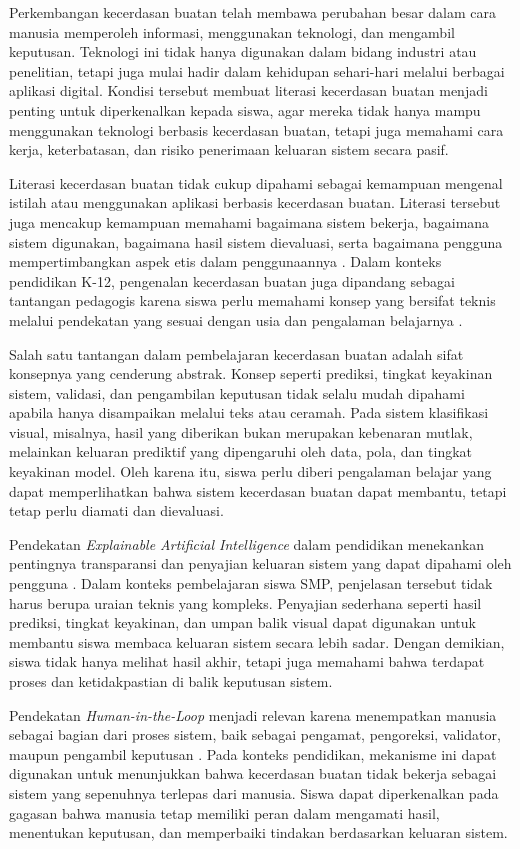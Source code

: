 \documentclass[12pt,a4paper,oneside,openany]{report}
\begin{document}
Perkembangan kecerdasan buatan telah membawa perubahan besar dalam cara manusia memperoleh informasi, menggunakan teknologi, dan mengambil keputusan. Teknologi ini tidak hanya digunakan dalam bidang industri atau penelitian, tetapi juga mulai hadir dalam kehidupan sehari-hari melalui berbagai aplikasi digital. Kondisi tersebut membuat literasi kecerdasan buatan menjadi penting untuk diperkenalkan kepada siswa, agar mereka tidak hanya mampu menggunakan teknologi berbasis kecerdasan buatan, tetapi juga memahami cara kerja, keterbatasan, dan risiko penerimaan keluaran sistem secara pasif.

Literasi kecerdasan buatan tidak cukup dipahami sebagai kemampuan mengenal istilah atau menggunakan aplikasi berbasis kecerdasan buatan. Literasi tersebut juga mencakup kemampuan memahami bagaimana sistem bekerja, bagaimana sistem digunakan, bagaimana hasil sistem dievaluasi, serta bagaimana pengguna mempertimbangkan aspek etis dalam penggunaannya \cite{ref1}. Dalam konteks pendidikan K-12, pengenalan kecerdasan buatan juga dipandang sebagai tantangan pedagogis karena siswa perlu memahami konsep yang bersifat teknis melalui pendekatan yang sesuai dengan usia dan pengalaman belajarnya \cite{ref2}.

Salah satu tantangan dalam pembelajaran kecerdasan buatan adalah sifat konsepnya yang cenderung abstrak. Konsep seperti prediksi, tingkat keyakinan sistem, validasi, dan pengambilan keputusan tidak selalu mudah dipahami apabila hanya disampaikan melalui teks atau ceramah. Pada sistem klasifikasi visual, misalnya, hasil yang diberikan bukan merupakan kebenaran mutlak, melainkan keluaran prediktif yang dipengaruhi oleh data, pola, dan tingkat keyakinan model. Oleh karena itu, siswa perlu diberi pengalaman belajar yang dapat memperlihatkan bahwa sistem kecerdasan buatan dapat membantu, tetapi tetap perlu diamati dan dievaluasi.

Pendekatan \textit{Explainable Artificial Intelligence} dalam pendidikan menekankan pentingnya transparansi dan penyajian keluaran sistem yang dapat dipahami oleh pengguna \cite{ref3}. Dalam konteks pembelajaran siswa SMP, penjelasan tersebut tidak harus berupa uraian teknis yang kompleks. Penyajian sederhana seperti hasil prediksi, tingkat keyakinan, dan umpan balik visual dapat digunakan untuk membantu siswa membaca keluaran sistem secara lebih sadar. Dengan demikian, siswa tidak hanya melihat hasil akhir, tetapi juga memahami bahwa terdapat proses dan ketidakpastian di balik keputusan sistem.

Pendekatan \textit{Human-in-the-Loop} menjadi relevan karena menempatkan manusia sebagai bagian dari proses sistem, baik sebagai pengamat, pengoreksi, validator, maupun pengambil keputusan \cite{ref4}. Pada konteks pendidikan, mekanisme ini dapat digunakan untuk menunjukkan bahwa kecerdasan buatan tidak bekerja sebagai sistem yang sepenuhnya terlepas dari manusia. Siswa dapat diperkenalkan pada gagasan bahwa manusia tetap memiliki peran dalam mengamati hasil, menentukan keputusan, dan memperbaiki tindakan berdasarkan keluaran sistem.
\end{document}
